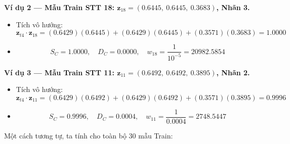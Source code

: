 \documentclass[12pt,a4paper]{article}
\begin{document}
\textbf{Ví dụ 2 — Mẫu Train STT 18: $\mathbf{z}_{18} = (0.6445,\ 0.6445,\ 0.3683)$, Nhãn 3.}
\begin{itemize}
    \item Tích vô hướng:
    \[
        \mathbf{z}_{t4} \cdot \mathbf{z}_{18}
        = (0.6429)(0.6445) + (0.6429)(0.6445) + (0.3571)(0.3683) = 1.0000
    \]
    \item
    \[
        S_C = 1.0000, \quad D_C = 0.0000, \quad
        w_{18} = \frac{1}{10^{-5}} = 20982.5854
    \]
\end{itemize}
 
\textbf{Ví dụ 3 — Mẫu Train STT 11: $\mathbf{z}_{11} = (0.6492,\ 0.6492,\ 0.3895)$, Nhãn 2.}
\begin{itemize}
    \item Tích vô hướng:
    \[
        \mathbf{z}_{t4} \cdot \mathbf{z}_{11}
        = (0.6429)(0.6492) + (0.6429)(0.6492) + (0.3571)(0.3895) = 0.9996
    \]
    \item
    \[
        S_C = 0.9996, \quad D_C = 0.0004, \quad
        w_{11} = \frac{1}{0.0004} = 2748.5447
    \]
\end{itemize}
 
Một cách tương tự, ta tính cho toàn bộ 30 mẫu Train:
 
\end{document}
